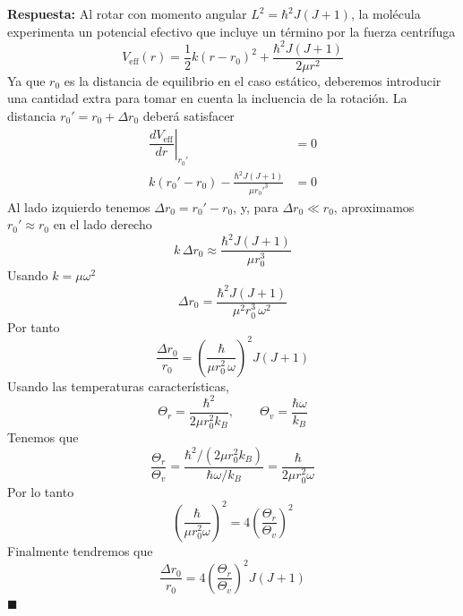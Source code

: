 \documentclass[]{article}
\numberwithin{equation}{section}
\newcommand{\0}{\textcolor{gray}{0}}
\newcommand{\eff}[1]{#1_\mathrm{eff}}
\newcommand{\qed}{\hfill\(\blacksquare\)}
\begin{document}
\textbf{Respuesta:} Al rotar con momento angular $L^2 = \hbar^2 J(J+1)$, la molécula experimenta un potencial efectivo que incluye un término por la fuerza centrífuga
\begin{equation}
	\eff{V}(r) = \frac{1}{2}k(r-r_0)^2 + \frac{\hbar^2 J(J+1)}{2\mu r^2}
\end{equation}
Ya que $r_0$ es la distancia de equilibrio en el caso estático, deberemos introducir una cantidad extra para tomar en cuenta la incluencia de la rotación. La distancia $r_0' = r_0 + \Delta r_0$ deberá satisfacer
\begin{align*}
	\left.\dfrac{d\eff{V}}{dr}\right|_{r_0'} &= 0 \\
	k(r_0' - r_0) - \frac{\hbar^2 J(J+1)}{\mu r_0'^3} &= 0
\end{align*}
Al lado izquierdo tenemos $\Delta r_0 = r_0' - r_0$, y, para $\Delta r_0 \ll r_0$, aproximamos $r_0' \approx r_0$ en el lado derecho
\begin{equation*}
	k\,\Delta r_0 \approx \frac{\hbar^2 J(J+1)}{\mu r_0^3}
\end{equation*}
Usando $k = \mu\omega^2$
\begin{equation*}
	\Delta r_0 = \frac{\hbar^2 J(J+1)}{\mu^2 r_0^3\,\omega^2}
\end{equation*}
Por tanto
\begin{equation}
	\frac{\Delta r_0}{r_0} = \left(\frac{\hbar}{\mu r_0^2\,\omega}\right)^2 J(J+1)
\end{equation}
Usando las temperaturas características,
\begin{equation}
	\Theta_r = \frac{\hbar^2}{2\mu r_0^2 k_B}, \qquad \Theta_v = \frac{\hbar\omega}{k_B}
\end{equation}
Tenemos que
\begin{equation*}
	\frac{\Theta_r}{\Theta_v} = \frac{\hbar^2/(2\mu r_0^2 k_B)}{\hbar\omega/k_B} = \frac{\hbar}{2\mu r_0^2\omega}
\end{equation*}
Por lo tanto
\begin{equation*}
	\left(\frac{\hbar}{\mu r_0^2\omega}\right)^2 = 4\left(\frac{\Theta_r}{\Theta_v}\right)^2
\end{equation*}
Finalmente tendremos que
\begin{equation}
	\frac{\Delta r_0}{r_0} = 4\left(\frac{\Theta_r}{\Theta_v}\right)^2 J(J+1)
\end{equation}
\qed
\end{document}
